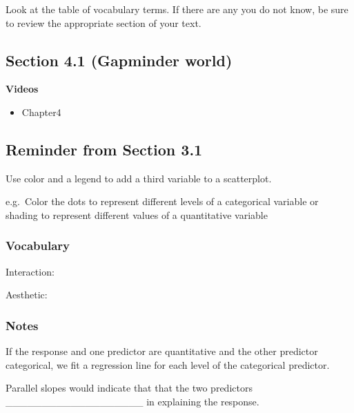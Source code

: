 \documentclass[
]{report}
\providecommand{\tightlist}{%
  \setlength{\itemsep}{0pt}\setlength{\parskip}{0pt}}
\newcommand{\rgi}{\hspace{24pt}}  %
\begin{document}
Look at the table of vocabulary terms. If there are any you do not know, be sure to review the appropriate section of your text.

\hypertarget{section-4.1-gapminder-world}{%
\subsection*{Section 4.1 (Gapminder world)}\label{section-4.1-gapminder-world}}


\textbf{Videos}

\begin{itemize}
\tightlist
\item
  Chapter4
\end{itemize}


\hypertarget{reminder-from-section-3.1}{%
\subsection*{Reminder from Section 3.1}\label{reminder-from-section-3.1}}

Use color and a legend to add a third variable to a scatterplot.

\rgi e.g.~Color the dots to represent different levels of a categorical variable or shading to represent different values of a quantitative variable

\hypertarget{vocabulary-9}{%
\subsubsection*{Vocabulary}\label{vocabulary-9}}

Interaction:
\rgi

Aesthetic:
\rgi

\hypertarget{notes-12}{%
\subsubsection*{Notes}\label{notes-12}}

If the response and one predictor are quantitative and the other predictor categorical, we fit a regression line for each level of the categorical predictor.

\rgi Parallel slopes would indicate that that the two predictors \_\_\_\_\_\_\_\_\_\_\_\_\_\_\_\_\_\_\_ in explaining the response.
\end{document}
